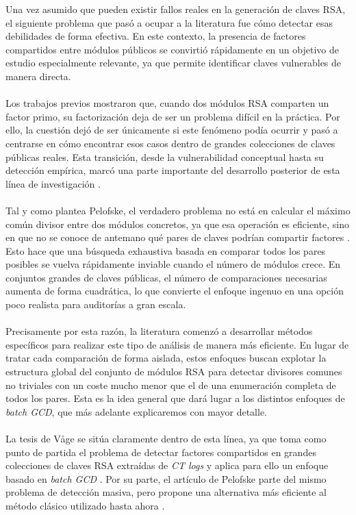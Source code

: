 Una vez asumido que pueden existir fallos reales en la generación de claves RSA, el siguiente problema que pasó a ocupar a la literatura fue cómo detectar esas debilidades de forma efectiva. En este contexto, la presencia de factores compartidos entre módulos públicos se convirtió rápidamente en un objetivo de estudio especialmente relevante, ya que permite identificar claves vulnerables de manera directa.
\\
\\
Los trabajos previos mostraron que, cuando dos módulos RSA comparten un factor primo, su factorización deja de ser un problema difícil en la práctica. Por ello, la cuestión dejó de ser únicamente si este fenómeno podía ocurrir y pasó a centrarse en cómo encontrar esos casos dentro de grandes colecciones de claves públicas reales. Esta transición, desde la vulnerabilidad conceptual hasta su detección empírica, marcó una parte importante del desarrollo posterior de esta línea de investigación \cite{heninger2012mining,vage2022finding}.
\\
\\
Tal y como plantea Pelofske, el verdadero problema no está en calcular el máximo común divisor entre dos módulos concretos, ya que esa operación es eficiente, sino en que no se conoce de antemano qué pares de claves podrían compartir factores \cite{pelofske2024efficient}. Esto hace que una búsqueda exhaustiva basada en comparar todos los pares posibles se vuelva rápidamente inviable cuando el número de módulos crece. En conjuntos grandes de claves públicas, el número de comparaciones necesarias aumenta de forma cuadrática, lo que convierte el enfoque ingenuo en una opción poco realista para auditorías a gran escala.
\\
\\
Precisamente por esta razón, la literatura comenzó a desarrollar métodos específicos para realizar este tipo de análisis de manera más eficiente. En lugar de tratar cada comparación de forma aislada, estos enfoques buscan explotar la estructura global del conjunto de módulos RSA para detectar divisores comunes no triviales con un coste mucho menor que el de una enumeración completa de todos los pares. Esta es la idea general que dará lugar a los distintos enfoques de \textit{batch GCD}, que más adelante explicaremos con mayor detalle.
\\
\\
La tesis de Våge se sitúa claramente dentro de esta línea, ya que toma como punto de partida el problema de detectar factores compartidos en grandes colecciones de claves RSA extraídas de \textit{CT logs} y aplica para ello un enfoque basado en \textit{batch GCD} \cite{vage2022finding}. Por su parte, el artículo de Pelofske parte del mismo problema de detección masiva, pero propone una alternativa más eficiente al método clásico utilizado hasta ahora \cite{pelofske2024efficient}.
